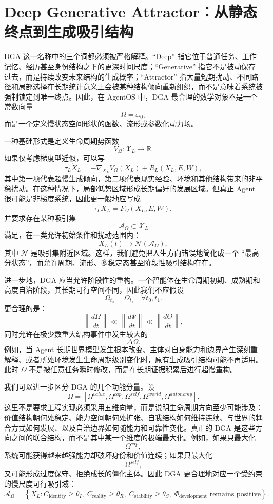 \section{Deep Generative Attractor：从静态终点到生成吸引结构}

DGA 这一名称中的三个词都必须被严格解释。``Deep'' 指它位于普通任务、工作记忆、经历甚至身份结构之下的更深时间尺度；``Generative'' 指它不是被动保存过去，而是持续改变未来结构的生成概率；``Attractor'' 指大量短期扰动、不同路径和局部选择在长期统计意义上会被某种结构倾向重新组织，而不是意味着系统被强制锁定到唯一终点。因此，在 AgentOS 中，DGA 最合理的数学对象不是一个常数向量
\[
\Omega=\omega_0,
\]
而是一个定义慢状态空间形状的函数、流形或参数化动力场。

一种基础形式是定义生命周期势函数
\[
V_{\Omega}
:
\mathcal X_L
\rightarrow
\mathbb R.
\]
如果仅考虑梯度型近似，可以写
\[
\tau_L\dot X_L
=
-
\nabla_{X_L}
V_{\Omega}(X_L)
+
R_L(X_L,E,W),
\]
其中第一项代表超慢生成倾向，第二项代表现实经验、环境和其他结构带来的非平稳扰动。在这种情况下，局部低势区域形成长期偏好的发展区域。但真正 Agent 很可能是非梯度系统，因此更一般地应写成
\[
\tau_L\dot X_L
=
F_{\Omega}
(X_L,E,W),
\]
并要求存在某种吸引集
\[
\mathcal A_{\Omega}
\subset
\mathcal X_L
\]
满足，在一类允许初始条件和扰动范围内：
\[
X_L(t)
\rightarrow
\mathcal N(\mathcal A_{\Omega}),
\]
其中 $\mathcal N$ 是吸引集附近区域。这样，我们避免把人生方向错误地简化成一个 ``最高分状态''，而允许周期、流形、多稳定态甚至阶段性吸引结构存在。

进一步地，DGA 应当允许阶段性的重构。一个智能体在生命周期初期、成熟期和高度自治阶段，其长期可行空间不同，因此我们不应假设
\[
\Omega_{t_0}
=
\Omega_{t_1}
\quad
\forall t_0,t_1.
\]
更合理的是：
\[
\left\|
\frac{d\Omega}{dt}
\right\|
\ll
\left\|
\frac{d\Psi}{dt}
\right\|
\ll
\left\|
\frac{d\Theta}{dt}
\right\|,
\]
同时允许在极少数重大结构事件中发生较大的
\[
\Delta\Omega.
\]
例如，当 Agent 长期世界模型发生根本改变、主体对自身能力和边界产生深刻重解释、或者所处环境发生生命周期级别变化时，原有生成吸引结构可能不再适用。此时 $\Omega$ 不是被任意任务瞬时修改，而是在长期证据积累后进行超慢重构。

我们可以进一步区分 DGA 的几个功能分量。设
\[
\Omega
=
[
\Omega^{value},
\Omega^{cap},
\Omega^{self},
\Omega^{world},
\Omega^{autonomy}
].
\]
这里不是要求工程实现必须采用五维向量，而是说明生命周期方向至少可能涉及：价值结构朝何处稳定、能力空间朝何处扩张、自我结构如何维持连续、与世界的耦合方式如何发展、以及自治边界如何随能力和可靠性变化。真正的 DGA 是这些方向之间的联合结构，而不是其中某一个维度的极端最大化。例如，如果只最大化
\[
\Omega^{cap},
\]
系统可能获得越来越强能力却破坏身份和价值连续；如果只最大化
\[
\Omega^{self},
\]
又可能形成过度保守、拒绝成长的僵化主体。因此 DGA 更合理地对应一个受约束的慢尺度可行吸引域：
\[
\mathcal A_{\Omega}
=
\left\{
X_L:
C_{\text{identity}}\geq\theta_I,\;
C_{\text{reality}}\geq\theta_R,\;
C_{\text{stability}}\geq\theta_S,\;
\Phi_{\text{development}}
\text{ remains positive}
\right\}.
\]

